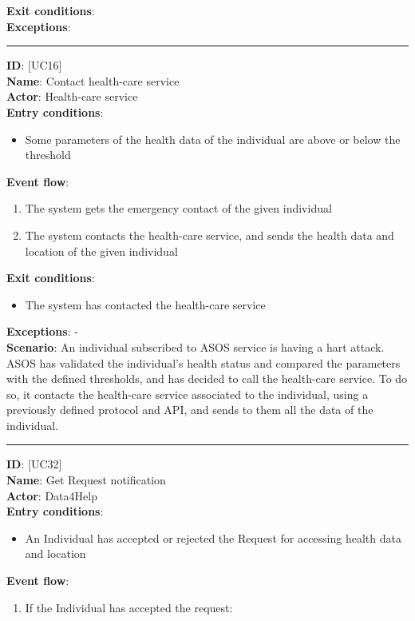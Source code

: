\documentclass[a4paper, hidelinks, 12pt]{report}
\newcommand\usecase[1]{ [UC#1] }
\begin{document}
\begin{itemize}
\begin{enumerate}
		\end{enumerate}
		\textbf{Exit conditions}: \\
		\textbf{Exceptions}: \\
		\rule{\linewidth}{0.4pt}
		\textbf{ID}: \usecase{16} \\
		\textbf{Name}: Contact health-care service \\
		\textbf{Actor}: Health-care service \\
		\textbf{Entry conditions}:
		\begin{itemize}
			\item{Some parameters of the health data of the individual are above or below the threshold}
		\end{itemize}
		\textbf{Event flow}:
		\begin{enumerate}
			\item{The system gets the emergency contact of the given individual}
			\item{The system contacts the health-care service, and sends the health data and location of the given individual}
		\end{enumerate}
		\textbf{Exit conditions}:
		\begin{itemize}
			\item{The system has contacted the health-care service}
		\end{itemize}
		\textbf{Exceptions}: - \\
		\textbf{Scenario}: An individual subscribed to ASOS service is having a hart attack. ASOS has validated the individual's health status and compared the parameters with the defined thresholds, and has decided to call the health-care service. To do so, it contacts the health-care service associated to the individual, using a previously defined protocol and API, and sends to them all the data of the individual. \\
		\rule{\linewidth}{0.4pt}
		\textbf{ID}: \usecase{32} \\
		\textbf{Name}: Get Request notification \\
		\textbf{Actor}: Data4Help \\
		\textbf{Entry conditions}:
		\begin{itemize}
			\item{An Individual has accepted or rejected the Request for accessing health data and location}
		\end{itemize}
		\textbf{Event flow}:
		\begin{enumerate}
			\item{If the Individual has accepted the request}:

\end{enumerate}
\end{itemize}
\end{document}
